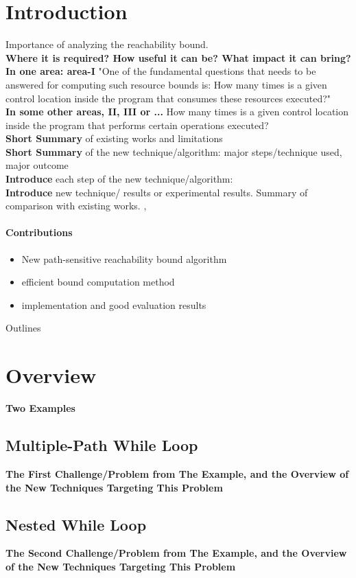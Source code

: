 \documentclass[sigplan,10pt,review,anonymous]{acmart}
\begin{document}
\section{Introduction}
Importance of analyzing the reachability bound.
\\
\textbf{Where it is required? How useful it can be? What impact it can bring?}
\\
\textbf{In one area: area-I}
"One of the fundamental questions that needs to be answered for computing such resource bounds is: 
How many times is a given control location inside the program that consumes these resources executed?"
\\
\textbf{In some other areas, II, III or ...}
How many times is a given control location inside the program that performs certain operations executed?
\\
\textbf{Short Summary} of existing works and limitations
\\
\textbf{Short Summary} of the new technique/algorithm: major steps/technique used,  major outcome
\\
\textbf{Introduce} each step of the new technique/algorithm:
\\
\textbf{Introduce} new technique/ results or experimental results. 
Summary of comparison with existing works. \cite{GulwaniJK09} \cite{Sumit2010rechability}, \cite{sinn2017complexity}
\\
\paragraph{Contributions}
\begin{itemize}
  \item New path-sensitive reachability bound algorithm
  \item efficient bound computation method \cite{GulwaniJK09} 
  \item implementation and good evaluation results
\end{itemize}
Outlines
\section{Overview}
\label{sec:overview}
\textbf{Two Examples}
\subsection{Multiple-Path While Loop}
\textbf{The First Challenge/Problem from The Example, 
and the Overview of the New Techniques Targeting This Problem}
\subsection{Nested While Loop}
\textbf{The Second Challenge/Problem from The Example,
and the Overview of the New Techniques Targeting This Problem}
\end{document}

